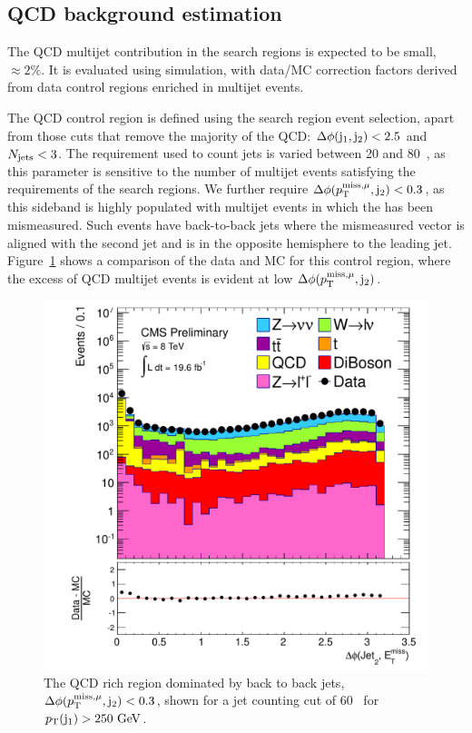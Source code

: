 \subsection{QCD background estimation}
\label{section:QCD}

The QCD multijet contribution in the search regions is expected to be small, $\approx 2\%$.
It is evaluated using simulation, with data/MC correction factors derived from data control regions enriched in multijet events.

The QCD control region is defined using the search region event selection, 
apart from those cuts that remove the majority of the QCD: $\Delta \phi({\rm j}_1, {\rm j}_2)<2.5$ and $N_{\text{jets}} < 3$.
The \pt{} requirement used to count jets is varied between 20 and 80~\GeV, as this parameter is sensitive to the number of multijet events satisfying the requirements of the search regions. 
We further require $\Delta \phi (p^{\rm miss, \mu}_{\rm T}, {\rm j}_{2}) < 0.3$, as this sideband is highly populated with multijet events in which the \MET has been mismeasured. 
Such events have back-to-back jets where the mismeasured \METvmu vector is aligned with the second jet and is in the opposite hemisphere to the leading jet. 
Figure~\ref{dphi_METj2} shows a comparison of the data and MC for this control region, where the excess of QCD multijet events is evident at low  $\Delta \phi (p^{\rm miss, \mu}_{\rm T},{\rm j}_{2})$.


\begin{figure}[htbp!]
\begin{center}
 \includegraphics[scale=0.4]{Figures/sus13009/dPhi_MetLep_Jet2.pdf}
\caption{The QCD rich region dominated by back to back jets, $\Delta \phi(p^{\rm miss, \mu}_{\rm T}, {\rm j}_2)<0.3$, shown for a jet counting cut of 60~\GeV{} for $p_{\text{T}}({\rm j}_1) > 250~\mathrm{GeV}$.}
\label{dphi_METj2}
\end{center}
\end{figure}


